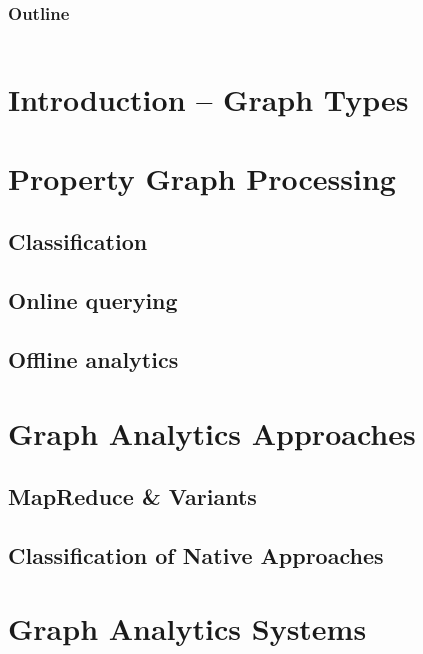 \documentclass[table,xcolor=pdftex,dvipsnames]{beamer}
\begin{document}
\begin{frame}
    \frametitle{Outline}
    \begin{columns}[T]
        \begin{column}{.45\textwidth}
            \tableofcontents[sections=1-4]
        \end{column}
        \begin{column}{.45\textwidth}
            \tableofcontents[sections=5]
        \end{column}
    \end{columns}
\end{frame}

\section{Introduction -- Graph Types}

\section{Property Graph Processing}
    \subsection{Classification}
    \subsection{Online querying}
    \subsection{Offline analytics}
\begin{frame}\end{frame}

\section{Graph Analytics Approaches}
    \subsection{MapReduce \& Variants}
    \subsection{Classification of Native Approaches}
    \begin{frame}\end{frame}

\section{Graph Analytics Systems}
\end{document}
